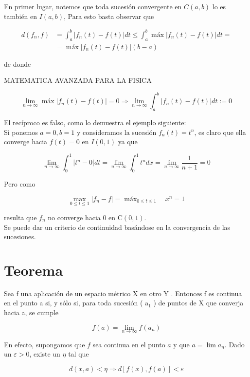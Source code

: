 \documentclass[10pt]{article}
\theoremstyle{plain}
\theoremstyle{definition}
\theoremstyle{remark}
\begin{document}
En primer lugar, notemos que toda sucesión convergente en $C(a, b)$ lo es también en $I(a, b)$, Para esto basta observar que

$$
\begin{aligned}
d\left(f_{n}, f\right) & =\int_{a}^{b}\left|f_{n}(t)-f(t)\right| d t \leqslant \int_{a}^{b} \operatorname{máx}\left|f_{n}(t)-f(t)\right| d t= \\
& =\operatorname{máx}\left|f_{n}(t)-f(t)\right|(b-a)
\end{aligned}
$$

de donde

MATEMATICA AVANZADA PARA LA FISICA

$$
\lim _{n \rightarrow \infty} \operatorname{máx}\left|f_{n}(t)-f(t)\right|=0 \Rightarrow \lim _{n \rightarrow \infty} \int_{a}^{b}\left|f_{n}(t)-f(t)\right| d t:=0
$$

El recíproco es falso, como lo demuestra el ejemplo siguiente:\\
Si ponemos $a=0, b=1$ y consideramos la sucesión $f_{n}(t)=t^{n}$, es claro que ella converge hacia $f(t)=0$ en $I(0,1)$ ya que

$$
\lim _{n \rightarrow \infty} \int_{0}^{1}\left|t^{n}-0\right| d t=\lim _{n \rightarrow \infty} \int_{0}^{1} t^{n} d x=\lim _{n \rightarrow \infty} \frac{1}{n+1}=0
$$

Pero como

$$
\max _{0 \leqslant t \leqslant 1}\left|f_{n}-f\right|=\operatorname{máx}_{0 \leqslant t \leqslant 1} \quad x^{n}=1
$$

resulta que $f_{n}$ no converge hacia 0 en $\mathrm{C}(0,1)$.\\
Se puede dar un criterio de continuidad basándose en la convergencia de las sucesiones.

\section*{Teorema}
Sea f una aplicación de un espacio métrico X en otro Y . Entonces f es continua en el punto a si, y sólo si, para toda sucesión ( $\mathrm{a}_{1}$ ) de puntos de X que converja hacia a, se cumple

$$
f(a)=\lim _{n \rightarrow \infty} f\left(a_{n}\right)
$$

En efecto, supongamos que $f$ sea continua en el punto $a$ y que $a=\lim a_{n}$. Dado un $\varepsilon>0$, existe un $\eta$ tal que

$$
d(x, a)<\eta \Rightarrow d[f(x), f(a)]<\varepsilon
$$
\end{document}
